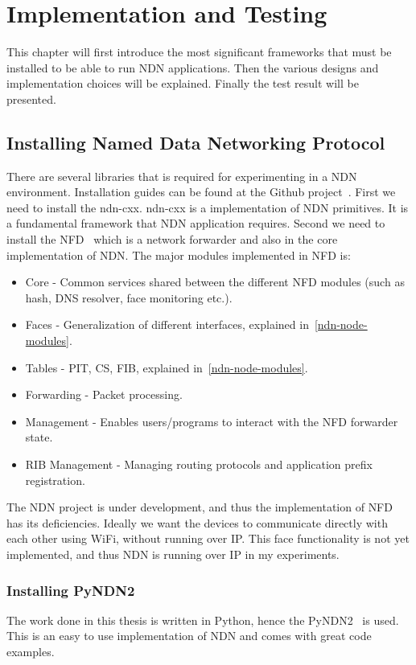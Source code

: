\chapter{Implementation and Testing}
This chapter will first introduce the most significant frameworks that must be installed to be able to run \gls{NDN} applications.
Then the various designs and implementation choices will be explained. 
Finally the test result will be presented.

\section{Installing Named Data Networking Protocol}

There are several libraries that is required for experimenting in a \gls{NDN} environment.
Installation guides can be found at the Github project~\cite{ndn-git}.
First we need to install the \gls{ndn-cxx}.
\gls{ndn-cxx} is a implementation of \gls{NDN} primitives. 
It is a fundamental framework that \gls{NDN} application requires. 
Second we need to install the \gls{NFD}~\cite{nfd} which is a network forwarder and also in the core implementation of \gls{NDN}.
The major modules implemented in \gls{NFD} is:
\begin{itemize}
  \item Core - Common services shared between the different \gls{NFD} modules (such as hash, \gls{DNS} resolver, face monitoring etc.).
  \item Faces - Generalization of different interfaces, explained in~\autoref{ndn-node-modules}.
  \item Tables - \gls{PIT}, \gls{CS}, \gls{FIB}, explained in~\autoref{ndn-node-modules}.
  \item Forwarding - Packet processing.
  \item Management - Enables users/programs to interact with the \gls{NFD} forwarder state.
  \item\gls{RIB} Management - Managing routing protocols and application prefix registration.
\end{itemize}
The \gls{NDN} project is under development, and thus the implementation of \gls{NFD} has its deficiencies.
Ideally we want the devices to communicate directly with each other using WiFi, without running over \gls{IP}. 
This face functionality is not yet implemented, and thus \gls{NDN} is running over \gls{IP} in my experiments.

\subsection{Installing PyNDN2}
The work done in this thesis is written in Python, hence the \gls{PyNDN2}~\cite{pyndn2-git} is used.
This is an easy to use implementation of \gls{NDN} and comes with great code examples.

